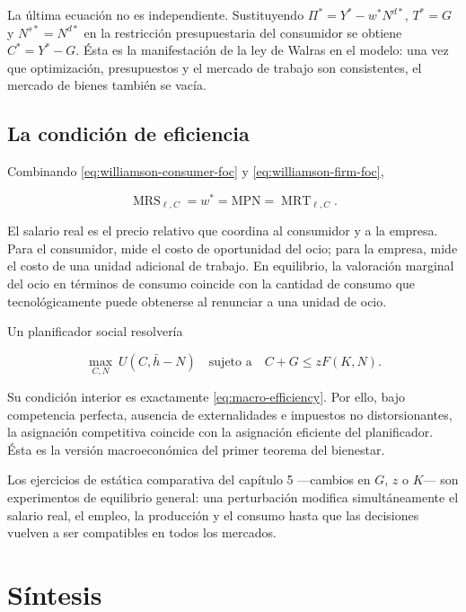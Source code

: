 \documentclass[12pt]{article}
\theoremstyle{cideplain}
\theoremstyle{cidedef}
\DeclareMathOperator{\MRS}{MRS}
\DeclareMathOperator{\MRT}{MRT}
\begin{document}
La última ecuación no es independiente. Sustituyendo
\(\Pi^*=Y^*-w^*N^{d*}\), \(T^*=G\) y \(N^{s*}=N^{d*}\) en la restricción
presupuestaria del consumidor se obtiene \(C^*=Y^*-G\). Ésta es la manifestación de la
ley de Walras en el modelo: una vez que optimización, presupuestos y el mercado de trabajo
son consistentes, el mercado de bienes también se vacía.

\subsection{La condición de eficiencia}

Combinando \eqref{eq:williamson-consumer-foc} y
\eqref{eq:williamson-firm-foc},

\begin{equation}
  \MRS_{\ell,C}=w^*=\mathrm{MPN}=\MRT_{\ell,C}.
  \label{eq:macro-efficiency}
\end{equation}

El salario real es el precio relativo que coordina al consumidor y a la empresa. Para el
consumidor, mide el costo de oportunidad del ocio; para la empresa, mide el costo de una
unidad adicional de trabajo. En equilibrio, la valoración marginal del ocio en términos de
consumo coincide con la cantidad de consumo que tecnológicamente puede obtenerse al
renunciar a una unidad de ocio.

Un planificador social resolvería

\begin{equation}
  \max_{C,N}\ U(C,\bar h-N)
  \quad\text{sujeto a}\quad
  C+G\leq zF(K,N).
  \label{eq:social-planner-macro}
\end{equation}

Su condición interior es exactamente \eqref{eq:macro-efficiency}. Por ello, bajo
competencia perfecta, ausencia de externalidades e impuestos no distorsionantes, la
asignación competitiva coincide con la asignación eficiente del planificador. Ésta es la
versión macroeconómica del primer teorema del bienestar.

Los ejercicios de estática comparativa del capítulo 5 ---cambios en \(G\), \(z\) o \(K\)---
son experimentos de equilibrio general: una perturbación modifica simultáneamente el
salario real, el empleo, la producción y el consumo hasta que las decisiones vuelven a ser
compatibles en todos los mercados.

\section{Síntesis}
\end{document}
